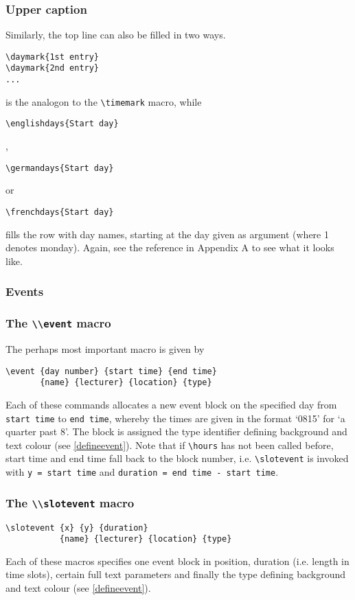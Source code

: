 \documentclass[a4paper,10pt]{article}
\begin{document}
\subsubsection{Upper caption}
Similarly, the top line can also be filled in two ways.
\begin{lstlisting}
\daymark{1st entry}
\daymark{2nd entry}
...
\end{lstlisting}
is the analogon to the \lstinline{\timemark} macro, while
\begin{lstlisting}
\englishdays{Start day}
\end{lstlisting}
,
\begin{lstlisting}
\germandays{Start day}
\end{lstlisting}
or
\begin{lstlisting}
\frenchdays{Start day}
\end{lstlisting}
fills the row with day names, starting at the day given as argument (where 1 denotes monday). Again, see the reference in Appendix A to see what it looks like.

\subsubsection{Events}
\subsubsection*{The \lstinline{\\event} macro}
The perhaps most important macro is given by
\begin{lstlisting}
\event {day number} {start time} {end time}
       {name} {lecturer} {location} {type}
\end{lstlisting}
Each of these commands allocates a new event block on the specified day from \lstinline{start time} to \lstinline{end time}, whereby the times are given in the format `0815' for `a quarter past 8'. The block is assigned the type identifier defining background and text colour (see \ref{defineevent}). Note that if \lstinline{\hours} has not been called before, start time and end time fall back to the block number, i.e. \lstinline{\slotevent} is invoked with \lstinline{y = start time} and \lstinline{duration = end time - start time}.

\subsubsection*{The \lstinline{\\slotevent} macro}
\begin{lstlisting}
\slotevent {x} {y} {duration}
           {name} {lecturer} {location} {type}
\end{lstlisting}
Each of these macros specifies one event block in position, duration (i.e. length in time slots), certain full text parameters and finally the type defining background and text colour (see \ref{defineevent}).
\end{document}
